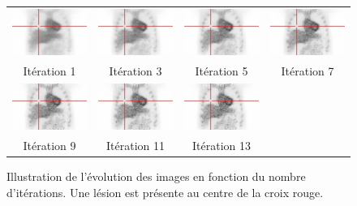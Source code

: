 \begin{figure}
\centering
\begin{tabular}{|c|c|c|c|}
 \includegraphics[width=3cm]{images/ite1} & \includegraphics[width=3cm]{images/ite3} & \includegraphics[width=3cm]{images/ite5} & \includegraphics[width=3cm]{images/ite7} \\
Itération 1  & Itération 3 & Itération 5 & Itération 7 \\
\hline
 \includegraphics[width=3cm]{images/ite9} & \includegraphics[width=3cm]{images/ite11} & \includegraphics[width=3cm]{images/ite13} &  \\
Itération 9  & Itération 11 & Itération 13 &\\
\end{tabular}

\caption[Illustration de l'évolution des lésions en fonction du nombre d'itérations]{Illustration de l'évolution des images en fonction du nombre d'itérations. Une lésion est présente au centre de la croix rouge.}
\label{fig:evolRecon}
\end{figure}

